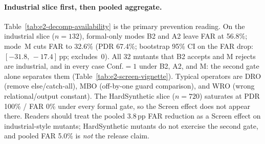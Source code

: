 




\paragraph{Industrial slice first, then pooled aggregate.}
Table~\ref{tab:e2-decomp-availability} is the primary prevention reading.
On the industrial slice ($n{=}132$), formal-only modes B2 and A2 leave FAR at
56.8\%; mode~M cuts FAR to 32.6\% (PDR 67.4\%; bootstrap 95\% CI on the FAR
drop: $[-31.8,\,-17.4]$\,pp; excludes~0).
All 32 mutants that B2 accepts and M rejects are industrial, and in every case
Conf.${=}1$ under B2, A2, and M: the second gate alone separates them
(Table~\ref{tab:e2-screen-vignette}).
Typical operators are DRO (remove else/catch-all), MBO (off-by-one guard
comparison), and WRO (wrong relational/output constant).
The HardSynthetic slice ($n{=}720$) saturates at PDR 100\% / FAR 0\% under
every formal gate, so the Screen effect does not appear there.
Readers should treat the pooled 3.8\,pp FAR reduction as a Screen effect on
industrial-style mutants; HardSynthetic mutants do not exercise the second
gate, and pooled FAR 5.0\% is \emph{not} the release claim.

\begin{table}[H]
  \caption{Implementation-screening prevention (E2 full evaluation,
    \texttt{prevention\_full\_v1}, $n{=}852$ mutant evaluations per mode).
    PDR = fraction of faulty mutants correctly rejected; FAR = fraction of
    faulty mutants incorrectly accepted (escape / false-accept rate;
    $\mathrm{PDR}+\mathrm{FAR}=1$ on this set).
    Spec-confusion breakdown appears in Figure~\ref{fig:prevention-heatmap}.}
  \label{tab:prevention}
  \centering
\end{table}

